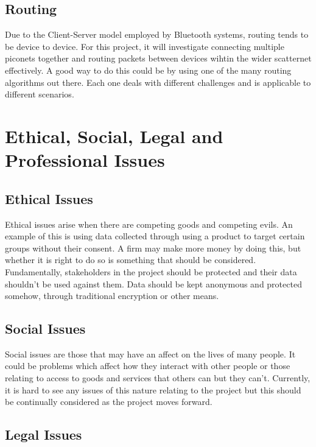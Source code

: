 \documentclass{report}
\begin{document}
\section*{Routing}

Due to the Client-Server model employed by Bluetooth systems, routing tends to be device to device. For this project, it will investigate connecting multiple piconets together 
and routing packets between devices wihtin the wider scatternet effectively. A good way to do this could be by using one of the many routing algorithms out there. Each one deals 
with different challenges and is applicable to different scenarios. 

\chapter*{Ethical, Social, Legal and Professional Issues}

\section*{Ethical Issues}

Ethical issues arise when there are competing goods and competing evils. An example of this 
is using data collected through using a product to target certain groups without their consent. 
A firm may make more money by doing this, but whether it is right to do so is something that 
should be considered. Fundamentally, stakeholders in the project should be protected and their 
data shouldn't be used against them. Data should be kept anonymous and protected somehow, through 
traditional encryption or other means. 

\section*{Social Issues}

Social issues are those that may have an affect on the lives of many people. It could be problems which 
affect how they interact with other people or those relating to access to goods and services that others can 
but they can't. Currently, it is hard to see any issues of this nature relating to the project but this should 
be continually considered as the project moves forward.

\section*{Legal Issues}
\end{document}
